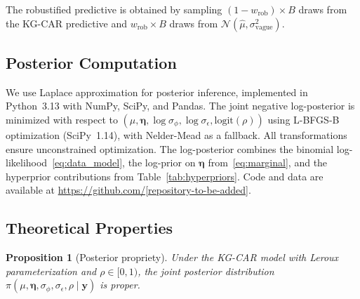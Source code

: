 \documentclass[12pt]{article}
\newtheorem{proposition}{Proposition}
\begin{document}
The robustified predictive is obtained by sampling $(1 - w_{\text{rob}}) \times B$ draws from the KG-CAR predictive and $w_{\text{rob}} \times B$ draws from $\mathcal{N}(\hat{\mu}, \sigma_{\text{vague}}^2)$.

\subsection{Posterior Computation}
\label{sec:computation}

We use Laplace approximation for posterior inference, implemented in Python~3.13 with NumPy, SciPy, and Pandas. The joint negative log-posterior is minimized with respect to $(\mu, \boldsymbol{\eta}, \log \sigma_\phi, \log \sigma_\epsilon, \text{logit}(\rho))$ using L-BFGS-B optimization (SciPy~1.14), with Nelder-Mead as a fallback. All transformations ensure unconstrained optimization. The log-posterior combines the binomial log-likelihood~\eqref{eq:data_model}, the log-prior on $\boldsymbol{\eta}$ from~\eqref{eq:marginal}, and the hyperprior contributions from Table~\ref{tab:hyperpriors}. Code and data are available at \url{https://github.com/[repository-to-be-added]}.

\subsection{Theoretical Properties}
\label{sec:theory}

\begin{proposition}[Posterior propriety]
\label{prop:propriety}
Under the KG-CAR model with Leroux parameterization and $\rho \in [0, 1)$, the joint posterior distribution $\pi(\mu, \boldsymbol{\eta}, \sigma_\phi, \sigma_\epsilon, \rho \mid \mathbf{y})$ is proper.
\end{proposition}
\end{document}
